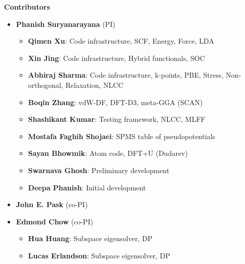   \begin{frame}[allowframebreaks]{\textbf{Contributors}} \label{Contributors}

	\begin{itemize}
	\item \textbf{Phanish Suryanarayana} (PI)
	\begin{itemize}
 	    \item \textbf{Qimen Xu}: Code infrastructure, SCF, Energy, Force, LDA \\  
        \item \textbf{Xin Jing}: Code infrastructure, Hybrid functionals, SOC \\  
 	    \item \textbf{Abhiraj Sharma}: Code infrastructure, k-points, PBE, Stress, Non-orthogonal, Relaxation, NLCC \\   
 	    \item \textbf{Boqin Zhang}: vdW-DF, DFT-D3, meta-GGA (SCAN) \\  
 	    \item \textbf{Shashikant Kumar}: Testing framework, NLCC, MLFF \\  
            \item \textbf{Mostafa Faghih Shojaei}: SPMS table of pseudopotentials \\ 
            \item \textbf{Sayan Bhowmik\footnotemark[1]}: Atom code, DFT+U (Dudarev) \\
            \item \textbf{Swarnava Ghosh}: Preliminary development \\
            \item \textbf{Deepa Phanish}: Initial development
 	\end{itemize}
    \item \textbf{John E. Pask} (co-PI)
    \item \textbf{Edmond Chow} (co-PI)
    \begin{itemize}
        \item \textbf{Hua Huang}: Subspace eigensolver, DP
        \item \textbf{Lucas Erlandson}: Subspace eigensolver, DP
    \end{itemize}

\end{itemize}
\end{frame}
